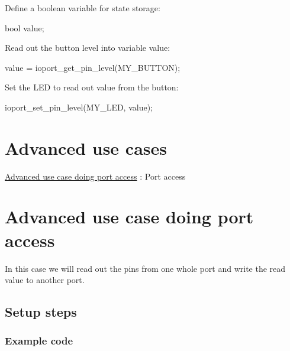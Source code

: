 \begin{DoxyEnumerate}
\item Define a boolean variable for state storage\-:
\begin{DoxyItemize}
\item 
\begin{DoxyCode}
 \textcolor{keywordtype}{bool} value; 
\end{DoxyCode}

\end{DoxyItemize}
\item Read out the button level into variable value\-:
\begin{DoxyItemize}
\item 
\begin{DoxyCode}
 value = ioport\_get\_pin\_level(MY\_BUTTON); 
\end{DoxyCode}

\end{DoxyItemize}
\item Set the L\-E\-D to read out value from the button\-:
\begin{DoxyItemize}
\item 
\begin{DoxyCode}
 ioport\_set\_pin\_level(MY\_LED, value); 
\end{DoxyCode}

\end{DoxyItemize}
\end{DoxyEnumerate}\hypertarget{ioport_quickstart_ioport_quickstart_advanced}{}\section{Advanced use cases}\label{ioport_quickstart_ioport_quickstart_advanced}

\begin{DoxyItemize}
\item \hyperlink{ioport_quickstart_use_case_1}{Advanced use case doing port access} \-: Port access 
\end{DoxyItemize}\hypertarget{ioport_quickstart_use_case_1}{}\section{Advanced use case doing port access}\label{ioport_quickstart_use_case_1}
In this case we will read out the pins from one whole port and write the read value to another port.\hypertarget{ioport_quickstart_use_case_1_ioport_quickstart_use_case_1_setup}{}\subsection{Setup steps}\label{ioport_quickstart_use_case_1_ioport_quickstart_use_case_1_setup}
\hypertarget{ioport_quickstart_use_case_1_ioport_quickstart_use_case_1_setup_code}{}\subsubsection{Example code}\label{ioport_quickstart_use_case_1_ioport_quickstart_use_case_1_setup_code}

